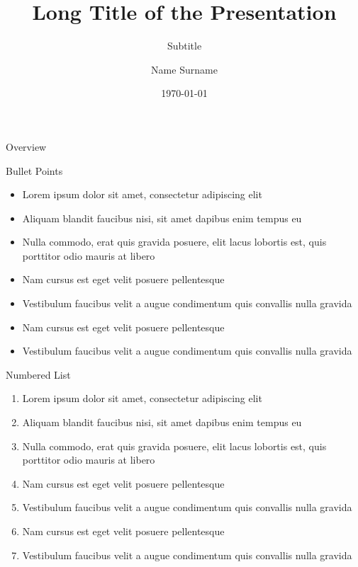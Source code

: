 \documentclass[aspectratio=169,xcolor=dvipsnames, t]{beamer}
\title[short title]{Long Title of the Presentation} %
\subtitle{Subtitle}
\author[Surname]{Name Surname}
\institute[Universitas Negeri Surabaya]{Program Study of Informatics Engineering \newline Faculty of Engineering\newline Universitas Negeri Surabaya}
\date{\today} %
\begin{document}
\maketitlepage

\begin{frame}[t]{Overview}
    \tableofcontents
\end{frame}


\begin{frame}{Bullet Points}
    \begin{itemize}
        \item Lorem ipsum dolor sit amet, consectetur adipiscing elit
        \item Aliquam blandit faucibus nisi, sit amet dapibus enim tempus eu
        \item Nulla commodo, erat quis gravida posuere, elit lacus lobortis est, quis porttitor odio mauris at libero
        \item Nam cursus est eget velit posuere pellentesque
        \item Vestibulum faucibus velit a augue condimentum quis convallis nulla gravida
        \item Nam cursus est eget velit posuere pellentesque
        \item Vestibulum faucibus velit a augue condimentum quis convallis nulla gravida
    \end{itemize}
\end{frame}

\begin{frame}{Numbered List}
    \begin{enumerate}
        \item Lorem ipsum dolor sit amet, consectetur adipiscing elit
        \item Aliquam blandit faucibus nisi, sit amet dapibus enim tempus eu
        \item Nulla commodo, erat quis gravida posuere, elit lacus lobortis est, quis porttitor odio mauris at libero
        \item Nam cursus est eget velit posuere pellentesque
        \item Vestibulum faucibus velit a augue condimentum quis convallis nulla gravida
        \item Nam cursus est eget velit posuere pellentesque
        \item Vestibulum faucibus velit a augue condimentum quis convallis nulla gravida
    \end{enumerate}
\end{frame}
\end{document}

